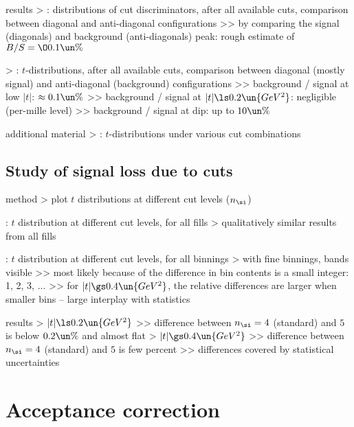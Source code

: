 \> results
\>> : distributions of cut discriminators, after all available cuts, comparison between diagonal and anti-diagonal configurations
\>>> by comparing the signal (diagonals) and background (anti-diagonals) peak: rough estimate of $B/S = \O{0.1\un{\%}}$

\>> : $t$-distributions, after all available cuts, comparison between diagonal (mostly signal) and anti-diagonal (background) configurations
\>>> background / signal at low $|t|$: $\approx 0.1\un{\%}$
\>>> background / signal at $|t| \ls 0.2\un{GeV^2}$: negligible (per-mille level)
\>>> background / signal at dip: up to $10\un{\%}$


\> additional material
\>> : $t$-distributions under various cut combinations

\subsection{Study of signal loss due to cuts}

\> method
\>> plot $t$ distributions at different cut levels ($n_\si$)

\> : $t$ distribution at different cut levels, for all fills
\>> qualitatively similar results from all fills

\> : $t$ distribution at different cut levels, for all binnings
\>> with fine binnings, bands visible
\>>> most likely because of the difference in bin contents is a small integer: 1, 2, 3, ...
\>>> for $|t| \gs 0.4\un{GeV^2}$, the relative differences are larger when smaller bins -- large interplay with statistics

\> results
\>> $|t| \ls 0.2\un{GeV^2}$
\>>> difference between $n_\si = 4$ (standard) and $5$ is below $0.2\un{\%}$ and almost flat
\>> $|t| \gs 0.4\un{GeV^2}$
\>>> difference between $n_\si = 4$ (standard) and $5$ is few percent
\>>> differences covered by statistical uncertainties



\section{Acceptance correction}

